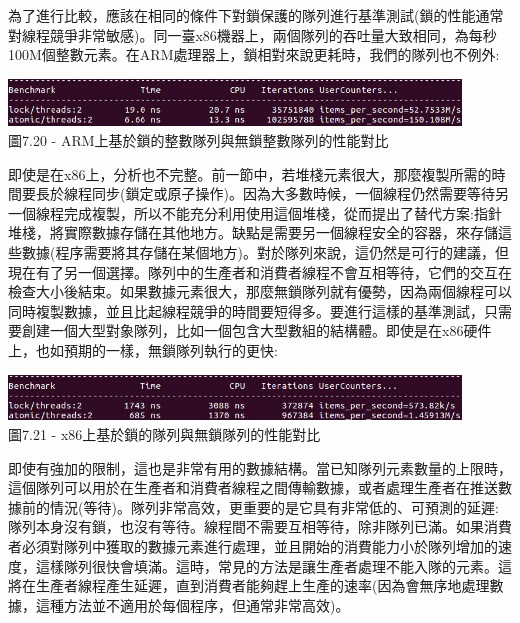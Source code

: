 為了進行比較，應該在相同的條件下對鎖保護的隊列進行基準測試(鎖的性能通常對線程競爭非常敏感)。同一臺x86機器上，兩個隊列的吞吐量大致相同，為每秒100M個整數元素。在ARM處理器上，鎖相對來說更耗時，我們的隊列也不例外:

\begin{center}
\includegraphics[width=0.9\textwidth]{content/2/chapter7/images/20.jpg}\\
圖7.20 - ARM上基於鎖的整數隊列與無鎖整數隊列的性能對比
\end{center}

即使是在x86上，分析也不完整。前一節中，若堆棧元素很大，那麼複製所需的時間要長於線程同步(鎖定或原子操作)。因為大多數時候，一個線程仍然需要等待另一個線程完成複製，所以不能充分利用使用這個堆棧，從而提出了替代方案:指針堆棧，將實際數據存儲在其他地方。缺點是需要另一個線程安全的容器，來存儲這些數據(程序需要將其存儲在某個地方)。對於隊列來說，這仍然是可行的建議，但現在有了另一個選擇。隊列中的生產者和消費者線程不會互相等待，它們的交互在檢查大小後結束。如果數據元素很大，那麼無鎖隊列就有優勢，因為兩個線程可以同時複製數據，並且比起線程競爭的時間要短得多。要進行這樣的基準測試，只需要創建一個大型對象隊列，比如一個包含大型數組的結構體。即使是在x86硬件上，也如預期的一樣，無鎖隊列執行的更快:

\begin{center}
\includegraphics[width=0.9\textwidth]{content/2/chapter7/images/21.jpg}\\
圖7.21 - x86上基於鎖的隊列與無鎖隊列的性能對比
\end{center}

即使有強加的限制，這也是非常有用的數據結構。當已知隊列元素數量的上限時，這個隊列可以用於在生產者和消費者線程之間傳輸數據，或者處理生產者在推送數據前的情況(等待)。隊列非常高效，更重要的是它具有非常低的、可預測的延遲:隊列本身沒有鎖，也沒有等待。線程間不需要互相等待，除非隊列已滿。如果消費者必須對隊列中獲取的數據元素進行處理，並且開始的消費能力小於隊列增加的速度，這樣隊列很快會填滿。這時，常見的方法是讓生產者處理不能入隊的元素。這將在生產者線程產生延遲，直到消費者能夠趕上生產的速率(因為會無序地處理數據，這種方法並不適用於每個程序，但通常非常高效)。

